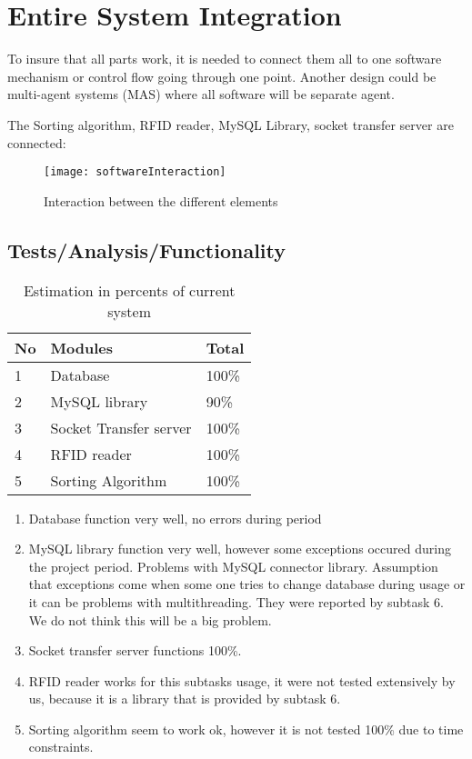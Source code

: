 %
\section{Entire System Integration}

To insure that all parts work, it is needed to connect them all to one software mechanism or control flow going through one point. Another design could be multi-agent systems (MAS) where all software will be separate agent.

The Sorting algorithm, RFID reader, MySQL Library, socket transfer server are connected:

\begin{figure}[h]
	\centering
		\texttt{[image: softwareInteraction]}
	\caption{Interaction between the different elements}
	\label{fig:softwareInteraction}
\end{figure}


\subsection{Tests/Analysis/Functionality}

\begin{table}[h]
	
    \begin{tabular}{ | p{0.5cm} | p{3.8cm} |p{1cm} |}
    \hline
	No & Modules & Total\\ \hline
	1 & Database & 100\% \\ \hline
	2 & MySQL library &  90\% \\ \hline
	3 & Socket Transfer server &  100\% \\ \hline
	4 & RFID reader &  100\% \\ \hline
	5 & Sorting Algorithm &  100\% \\ \hline
    \end{tabular}
	\caption{Estimation in percents of current system}
	\label{tab:percentSystem}
\end{table}

\begin{enumerate}
	\item Database function very well, no errors during period
	\item MySQL library function very well, however some exceptions occured during the project period. Problems with MySQL connector library. Assumption that exceptions come when some one tries to change database during usage or it can be problems with multithreading. They were reported by subtask 6. We do not think this will be a big problem.
	\item Socket transfer server functions 100\%.
	\item RFID reader works for this subtasks usage, it were not tested extensively by us, because it is a library that is provided by subtask 6.
	\item Sorting algorithm seem to work ok, however it is not tested 100\% due to time constraints.
\end{enumerate}

